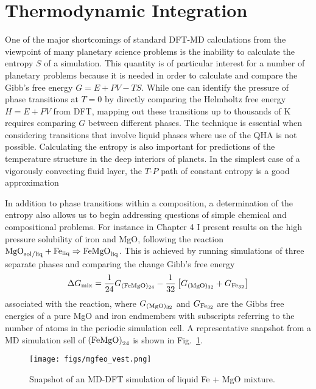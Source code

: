 \section{Thermodynamic Integration}

One of the major shortcomings of standard DFT-MD calculations from the viewpoint of
many planetary science problems is the inability to calculate the entropy $S$ of a
simulation. This quantity is of particular interest for a number of planetary
problems because it is needed in order to calculate and compare the Gibb's free
energy $G=E+PV-TS$. While one can identify the pressure of phase transitions at $T=0$
by directly comparing the Helmholtz free energy $H=E+PV$ from DFT, mapping out these
transitions up to thousands of K requires comparing $G$ between different phases.
The technique is essential when considering transitions that involve liquid phases
where use of the QHA is not possible. Calculating the entropy is also important for
predictions of the temperature structure in the deep interiors of planets. In the
simplest case of a vigorously convecting fluid layer, the $T$-$P$ path of constant
entropy is a good approximation

In addition to phase transitions within a
composition, a determination of the entropy also allows us to begin addressing
questions of simple chemical and compositional problems. For instance in Chapter 4 I
present results on the high pressure solubility of iron and MgO, following the
reaction $\rm{MgO}_{\rm sol/liq} + \rm{Fe}_{\rm liq} \Rightarrow \rm{FeMgO}_{\rm
liq}$. This is achieved by running simulations of three separate phases and comparing
the change Gibb's free energy
%
\begin{equation} \label{eqn:gibbs1}
  \Delta G_{\rm{\rm mix}}  =  \frac{1}{24}G_{\rm{(FeMgO)_{24}}} 
- \frac{1}{32} \left[  G_{\rm{(MgO)_{32}}}  + G_{\rm{Fe_{32}}} \right]
\end{equation}
%
associated with the reaction, where $G_{\rm{(MgO)_{32}}}$ and   $G_{\rm{Fe_{32}}}$
are the Gibbs free energies of a pure MgO and iron endmembers with subscripts
referring to the number of atoms in the periodic simulation cell. A representative
snapshot from a MD simulation sell of ${\rm(FeMgO)}_{24}$ is shown in
Fig.~\ref{femgosnap}.

 \begin{figure}[h!] %
   \centering
   \texttt{[image: figs/mgfeo\_vest.png]} 
\caption{Snapshot of an MD-DFT simulation of liquid Fe + MgO
    mixture.\label{femgosnap}}
\end{figure}

